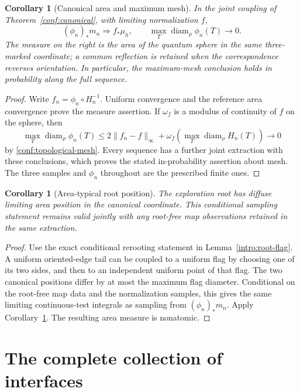 \documentclass[11pt]{article}
\numberwithin{equation}{section}
\newtheorem{corollary}[theorem]{Corollary}
\theoremstyle{definition}
\theoremstyle{remark}
\newcommand{\1}{\mathbf 1}
\DeclareMathOperator{\diam}{diam}
\begin{document}
\begin{corollary}[Canonical area and maximum mesh]
\label{conf:mesh-area}
In the joint coupling of Theorem~\ref{conf:canonical}, with
limiting normalization \(f\),
\[
 (\phi_n)_*m_n\Rightarrow f_*\mu_h,
 \qquad
 \max_T\diam_\rho\phi_n(T)\longrightarrow0.
\]
The measure on the right is the area of the quantum sphere in
the same three-marked coordinate; a common reflection is retained
when the correspondence reverses orientation.  In particular,
the maximum-mesh conclusion holds in probability along the full
sequence.
\end{corollary}

\begin{proof}
Write \(f_n=\phi_n\circ H_n^{-1}\).  Uniform convergence and
the reference area convergence prove the measure assertion.  If
\(\omega_f\) is a modulus of continuity of \(f\) on the sphere,
then
\[
 \max_T\diam_\rho\phi_n(T)
 \le2\|f_n-f\|_\infty+
       \omega_f\!\left(\max_T\diam_\rho H_n(T)\right)
       \longrightarrow0
\]
by \eqref{conf:topological-mesh}.  Every sequence has a further
joint extraction with these conclusions, which proves the stated
in-probability assertion about mesh.  The
three samples and \(\phi_n\) throughout are the prescribed
finite ones.
\end{proof}

\begin{corollary}[Area-typical root position]
\label{conf:root-area}
The exploration root has diffuse limiting area position in the
canonical coordinate.  This conditional sampling statement remains
valid jointly with any root-free map observations retained in the
same extraction.
\end{corollary}

\begin{proof}
Use the exact conditional rerooting statement in
Lemma~\ref{intro:root-flag}.  A uniform oriented-edge tail can be
coupled to a uniform flag by choosing one of its two sides, and
then to an independent uniform point of that flag.  The two
canonical positions differ by at most the maximum flag diameter.
Conditional on the root-free map data and the normalization
samples, this gives the same limiting continuous-test integrals
as sampling from \((\phi_n)_*m_n\).  Apply
Corollary~\ref{conf:mesh-area}.  The resulting area measure is
nonatomic.
\end{proof}

\section{The complete collection of interfaces}\label{loop:section}
\end{document}
